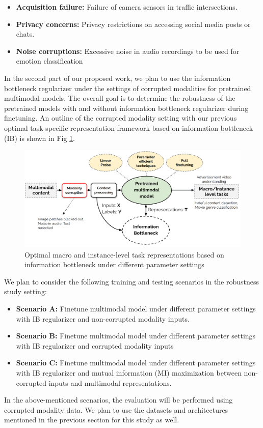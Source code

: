 \begin{itemize}
 \item \textbf{Acquisition failure:}  Failure of camera sensors in traffic intersections.
 \item \textbf{Privacy concerns:} Privacy restrictions on accessing social media posts or chats.
 \item \textbf{Noise corruptions:} Excessive noise in audio recordings to be used for emotion classification
\end{itemize}

In the second part of our proposed work, we plan to use the information bottleneck regularizer under the settings of corrupted modalities for pretrained multimodal models. The overall goal is to determine the robustness of the pretrained models with and without information bottleneck regularizer during finetuning. An outline of the corrupted modality setting with our previous optimal task-specific representation framework based on information bottleneck (IB) is shown in Fig \ref{robustness_multimodal_models}.

\begin{figure}
 \centering 
 \includegraphics[width=\textwidth]{figures/robustness_multimodal_models.png}
 \caption{Optimal macro and instance-level task representations based on information bottleneck under different parameter settings}
 \label{robustness_multimodal_models}
\end{figure}

We plan to consider the following training and testing scenarios in the robustness study setting:

\begin{itemize}

\item \textbf{Scenario A:} Finetune multimodal model under different parameter settings with IB regularizer and non-corrupted modality inputs.
\item \textbf{Scenario B:} Finetune multimodal model under different parameter settings with IB regularizer and corrupted modality inputs
\item \textbf{Scenario C:} Finetune multimodal model under different parameter settings with IB regularizer and mutual information (MI) maximization between non-corrupted inputs and multimodal representations.

\end{itemize}

In the above-mentioned scenarios, the evaluation will be performed using corrupted modality data. We plan to use the datasets and architectures mentioned in the previous section for this study as well. 
